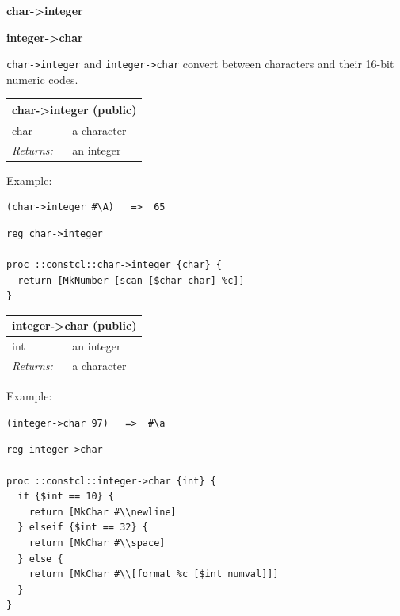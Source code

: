 \documentclass[twoside,9pt]{report}
\begin{document}
\textbf{char->integer}


\textbf{integer->char}


\texttt{char->integer} and \texttt{integer->char} convert between characters and their 16-bit numeric codes.

\begin{tabular}{ |l l| }
\hline
\multicolumn{2}{|l|}{char->integer (public)} \\
\hline
char & a character \\
\textit{Returns:} & an integer \\
\hline
\end{tabular}


Example:

\noindent\makebox[\linewidth]{\rule{\linewidth}{0.4pt}}
\begin{lstlisting}
(char->integer #\A)   =>  65
\end{lstlisting}
\noindent\makebox[\linewidth]{\rule{\linewidth}{0.4pt}}
\noindent\makebox[\linewidth]{\rule{\linewidth}{0.4pt}}
\begin{lstlisting}
reg char->integer
 
proc ::constcl::char->integer {char} {
  return [MkNumber [scan [$char char] %c]]
}
\end{lstlisting}
\noindent\makebox[\linewidth]{\rule{\linewidth}{0.4pt}}
\begin{tabular}{ |l l| }
\hline
\multicolumn{2}{|l|}{integer->char (public)} \\
\hline
int & an integer \\
\textit{Returns:} & a character \\
\hline
\end{tabular}


Example:

\noindent\makebox[\linewidth]{\rule{\linewidth}{0.4pt}}
\begin{lstlisting}
(integer->char 97)   =>  #\a
\end{lstlisting}
\noindent\makebox[\linewidth]{\rule{\linewidth}{0.4pt}}
\noindent\makebox[\linewidth]{\rule{\linewidth}{0.4pt}}
\begin{lstlisting}
reg integer->char
 
proc ::constcl::integer->char {int} {
  if {$int == 10} {
    return [MkChar #\\newline]
  } elseif {$int == 32} {
    return [MkChar #\\space]
  } else {
    return [MkChar #\\[format %c [$int numval]]]
  }
}
\end{lstlisting}
\noindent\makebox[\linewidth]{\rule{\linewidth}{0.4pt}}
\end{document}

